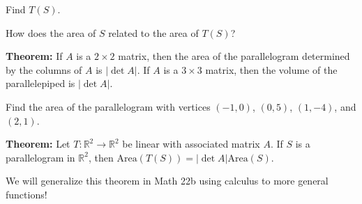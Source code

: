 \begin{enumerate}
\Part Find $T(S)$.

\vfill

\Part How does the area of $S$ related to the area of $T(S)$?

\vfill

\newpage

{\bf Theorem:} If $A$ is a $2 \times 2$ matrix, then the area of the parallelogram determined by the columns of $A$ is $|\det{A}|$. If $A$ is a $3 \times 3$ matrix, then the volume of the parallelepiped is $|\det{A}|$.

\Problem Find the area of the parallelogram with vertices $(-1,0)$, $(0,5)$, $(1,-4)$, and $(2,1)$.

\vfill

{\bf Theorem:} Let $T: \mathbb{R}^2 \to \mathbb{R}^2$ be linear with associated matrix $A$. If $S$ is a parallelogram in $\mathbb{R}^2$, then $\text{Area}(T(S))=|\det{A}|\text{Area}(S)$. 


We will generalize this theorem in Math 22b using calculus to more general functions!



\end{enumerate}
